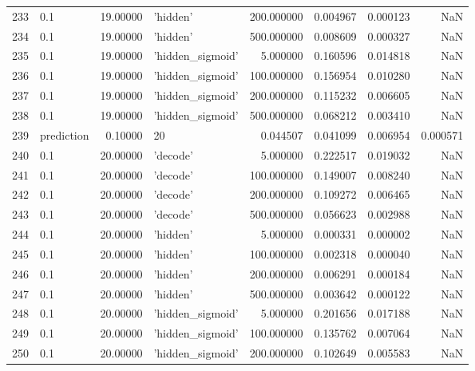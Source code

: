 \documentclass[10pt,a4paper]{article}
\begin{document}
\begin{tabular}{llrlrrrr}
233  &         0.1 &  19.00000 &           'hidden' &  200.000000 &  0.004967 &  0.000123 &       NaN \\
234  &         0.1 &  19.00000 &           'hidden' &  500.000000 &  0.008609 &  0.000327 &       NaN \\
235  &         0.1 &  19.00000 &   'hidden\_sigmoid' &    5.000000 &  0.160596 &  0.014818 &       NaN \\
236  &         0.1 &  19.00000 &   'hidden\_sigmoid' &  100.000000 &  0.156954 &  0.010280 &       NaN \\
237  &         0.1 &  19.00000 &   'hidden\_sigmoid' &  200.000000 &  0.115232 &  0.006605 &       NaN \\
238  &         0.1 &  19.00000 &   'hidden\_sigmoid' &  500.000000 &  0.068212 &  0.003410 &       NaN \\
239  &  prediction &   0.10000 &                 20 &    0.044507 &  0.041099 &  0.006954 &  0.000571 \\
240  &         0.1 &  20.00000 &           'decode' &    5.000000 &  0.222517 &  0.019032 &       NaN \\
241  &         0.1 &  20.00000 &           'decode' &  100.000000 &  0.149007 &  0.008240 &       NaN \\
242  &         0.1 &  20.00000 &           'decode' &  200.000000 &  0.109272 &  0.006465 &       NaN \\
243  &         0.1 &  20.00000 &           'decode' &  500.000000 &  0.056623 &  0.002988 &       NaN \\
244  &         0.1 &  20.00000 &           'hidden' &    5.000000 &  0.000331 &  0.000002 &       NaN \\
245  &         0.1 &  20.00000 &           'hidden' &  100.000000 &  0.002318 &  0.000040 &       NaN \\
246  &         0.1 &  20.00000 &           'hidden' &  200.000000 &  0.006291 &  0.000184 &       NaN \\
247  &         0.1 &  20.00000 &           'hidden' &  500.000000 &  0.003642 &  0.000122 &       NaN \\
248  &         0.1 &  20.00000 &   'hidden\_sigmoid' &    5.000000 &  0.201656 &  0.017188 &       NaN \\
249  &         0.1 &  20.00000 &   'hidden\_sigmoid' &  100.000000 &  0.135762 &  0.007064 &       NaN \\
250  &         0.1 &  20.00000 &   'hidden\_sigmoid' &  200.000000 &  0.102649 &  0.005583 &       NaN \\

\end{tabular}
\end{document}
